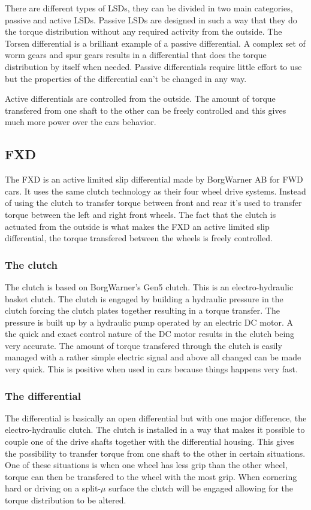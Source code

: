 There are different types of LSDs, they can be divided in two main categories, passive and active LSDs. Passive LSDs are designed in such a way that they do the torque distribution without any required activity from the outside. The Torsen differential is a brilliant example of a passive differential. A complex set of worm gears and spur gears results in a differential that does the torque distribution by itself when needed. Passive differentials require little effort to use but the properties of the differential can't be changed in any way.

Active differentials are controlled from the outside. The amount of torque transfered from one shaft to the other can be freely controlled and this gives much more power over the cars behavior.

\subsection{FXD}
The FXD is an active limited slip differential made by BorgWarner AB for FWD cars. It uses the same clutch technology as their four wheel drive systems. Instead of using the clutch to transfer torque between front and rear it's used to transfer torque between the left and right front wheels. The fact that the clutch is actuated from the outside is what makes the FXD an active limited slip differential, the torque transfered between the wheels is freely controlled.

\subsubsection{The clutch}
The clutch is based on BorgWarner's Gen5 clutch. This is an electro-hydraulic basket clutch. The clutch is engaged by building a hydraulic pressure in the clutch forcing the clutch plates together resulting in a torque transfer. The pressure is built up by a hydraulic pump operated by an electric DC motor. A the quick and exact control nature of the DC motor results in the clutch being very accurate. The amount of torque transfered through the clutch is easily managed with a rather simple electric signal and above all changed can be made very quick. This is positive when used in cars because things happens very fast.

\subsubsection{The differential}
The differential is basically an open differential but with one major difference, the electro-hydraulic clutch. The clutch is installed in a way that makes it possible to couple one of the drive shafts together with the differential housing. This gives the possibility to transfer torque from one shaft to the other in certain situations. One of these situations is when one wheel has less grip than the other wheel, torque can then be transfered to the wheel with the most grip. When cornering hard or driving on a split-$ \mu $ surface the clutch will be engaged allowing for the torque distribution to be altered.

